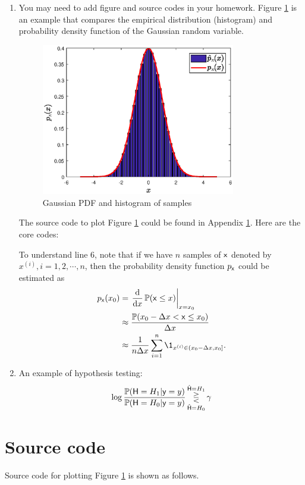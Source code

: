\documentclass[a4paper]{article}
\begin{document}
\begin{enumerate}
  \item You may need to add figure and source codes in your homework. Figure \ref{fig:1} is an example that compares the empirical distribution (histogram) and probability density function of the Gaussian random variable.
    \begin{figure}[htbp]
      \centering
      \includegraphics[width = 0.8\textwidth]{pdf_normal.eps}
      \caption{Gaussian PDF and histogram of samples}
      \label{fig:1}
    \end{figure}

  The source code to plot Figure \ref{fig:1} could be found in Appendix \ref{sec:a:code}. Here are the core codes:
  
  
  To understand line 6, note that if we have $n$ samples of $\mathsf{x}$ denoted by $x^{(i)}, i = 1, 2, \cdots, n$, then the probability density function $p_{\mathsf{x}}$ could be estimated as
  \begin{equation*}
    \begin{aligned}
      p_{\rvx}(x_0) &= \left.\frac{\mathrm{d}}{\mathrm{d}x} \Prob(\rvx \leq x) \right|_{x = x_0} \\
      &\approx \frac{\Prob(x_0 - \Delta x < \rvx \leq x_0)}{\Delta x}\\
      &\approx \frac{1}{n\Delta x} \sum_{i = 1}^n \1_{x^{(i)} \in (x_0 - \Delta x, x_0]}.
    \end{aligned}    
  \end{equation*}
  
\item An example of hypothesis testing:
  \begin{equation*}
   \log \frac{\operatorname{\mathbb{P}}(\mathsf{H} = H_1|\mathsf{y} = y)}{\operatorname{\mathbb{P}}(\mathsf{H} = H_0|\mathsf{y} = y)} 
   \mathop{\gtreqless}_{\hat{\mathsf{H}} = H_0}^{\hat{\mathsf{H}} = H_1} \gamma
  \end{equation*}
  
  \end{enumerate}

  
  \newpage
  
  \appendix
  \section{Source code}
  \label{sec:a:code}
  Source code for plotting Figure \ref{fig:1} is shown as follows.
  
  
\end{document}

